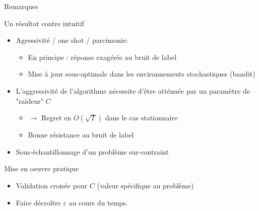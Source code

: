 \documentclass{beamer}
\begin{document}
\begin{frame}{Remarques}
	\begin{alertblock}{Un résultat contre intuitif}
		\begin{itemize}
		\item Agressivité / one shot / parcimonie:
		\begin{itemize}
			\item En principe : réponse exagérée au bruit de label
			\item Mise à jour sous-optimale dans les environnements stochastiques (bandit)
		\end{itemize}  
		\item L'aggressivité de l'algorithme nécessite d'être atténuée par un paramètre de "raideur" $C$
			\begin{itemize}
				\item $\rightarrow$ Regret en $O(\sqrt{T})$ dans le cas stationnaire
				\item Bonne résistance au bruit de label
			\end{itemize}
		\item Sous-échantillonnage d'un problème sur-contraint
		\end{itemize}
	\end{alertblock}
	
	\begin{exampleblock}{Mise en oeuvre pratique}
		\begin{itemize}
		\item Validation croisée pour $C$ (valeur spécifique au problème)
		\item Faire décroître $\varepsilon$ au cours du temps.
		\end{itemize}
	\end{exampleblock}
		
\end{frame}
\end{document}
